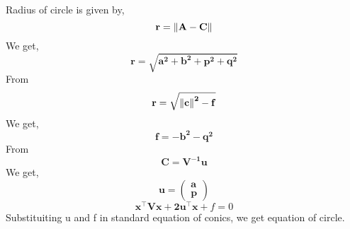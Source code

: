 \documentclass[journal,12pt,twocolumn]{IEEEtran}
\let\vec\mathbf
\begin{document}
\begin{tableofcontents}
Radius of circle is given by,
\begin{equation}
\vec{r=\norm{A-C}}
\end{equation}
We get,
\begin{equation}
\vec{r=\sqrt{a^2+b^2+p^2+q^2}}
\end{equation}
From
\begin{equation}
\vec{r=\sqrt{\norm{c}^2-f}}
\end{equation}
We get,
\begin{equation}
\vec{f=-b^2-q^2}
\end{equation}
From 
\begin{equation}
\vec{C=V^{-1}u}
\end{equation}
We get, 
\begin{equation}
\vec{u}
=
\begin{pmatrix}
\vec{a}\\
\vec{p}
\end{pmatrix}
\end{equation}
\begin{equation}
\vec{x}^{\top} \vec{V} \vec{x} + \vec{2} \vec{u}^{\top} \vec{x}+f=0
\end{equation}
Substituiting u and f in standard equation of conics, we get equation of circle.\\
\end{tableofcontents}
\end{document}
